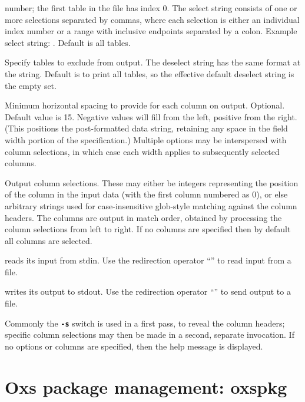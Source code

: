 \begin{description}
  number; the first table in the file has index 0.  The select string
  consists of one or more selections separated by commas, where each
  selection is either an individual index number or a range with
  inclusive endpoints separated by a colon.  Example select string:
  .  Default is all tables.
\item[\optkey{-no-table deselect}]
  Specify tables to exclude from output.  The deselect string has the
  same format at the  string.  Default is to print all
  tables, so the effective default deselect string is the empty set.
\item[\optkey{-w colwidth}]
  Minimum horizontal spacing to provide for each column on output.
  Optional.  Default value is 15. Negative  values will
  fill from the left, positive from the right. (This positions the
  post-formatted data string, retaining any space in the field width
  portion of the  specification.) Multiple 
  options may be interspersed with column selections, in which case each
  width applies to subsequently selected columns.
\item[\optkey{col \ldots}]
  Output column selections.  These may either be integers representing
  the position of the column in the input data (with the first column
  numbered as 0), or else arbitrary strings used for case-insensitive
  glob-style matching against the column headers.  The columns are
  output in match order, obtained by processing the column selections
  from left to right.  If no columns are specified then by default all
  columns are selected.
\item[\optkey{\boa infile}]
   reads its input from stdin.  Use the redirection operator
  ``\boa'' to read input from a file.
\item[\optkey{\bca outfile}]
   writes its output to stdout.  Use the redirection operator
  ``\bca'' to send output to a file.
\end{description}
Commonly the \texttt{\textbf{-s}} switch is used in a first pass, to
reveal the column headers; specific column selections may then be made
in a second, separate invocation.  If no options or columns are
specified, then the help message is displayed.


\section{Oxs package management:
            oxspkg\label{sec:oxspkg}}%

